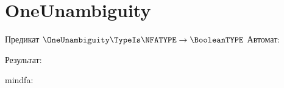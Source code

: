 \section{OneUnambiguity}
\begin{frame}{Предикат $\OneUnambiguity\TypeIs\NFATYPE\to\BooleanTYPE$}
	Автомат:


	Результат:


	mindfa:


\end{frame}

